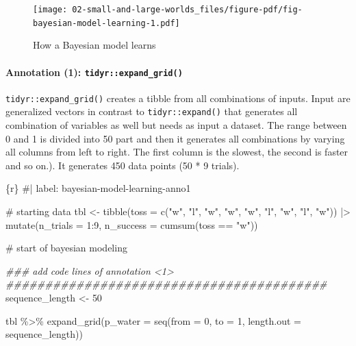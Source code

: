 \documentclass[
  letterpaper,
  DIV=11,
  numbers=noendperiod]{scrreprt}
\let\oldparagraph\paragraph
\renewcommand{\paragraph}[1]{\oldparagraph{#1}\mbox{}}
\newenvironment{Shaded}{\begin{snugshade}}{\end{snugshade}}
\newcommand{\AttributeTok}[1]{\textcolor[rgb]{0.40,0.45,0.13}{#1}}
\newcommand{\CommentTok}[1]{\textcolor[rgb]{0.37,0.37,0.37}{#1}}
\newcommand{\DecValTok}[1]{\textcolor[rgb]{0.68,0.00,0.00}{#1}}
\newcommand{\DocumentationTok}[1]{\textcolor[rgb]{0.37,0.37,0.37}{\textit{#1}}}
\newcommand{\FunctionTok}[1]{\textcolor[rgb]{0.28,0.35,0.67}{#1}}
\newcommand{\InformationTok}[1]{\textcolor[rgb]{0.37,0.37,0.37}{#1}}
\newcommand{\NormalTok}[1]{\textcolor[rgb]{0.00,0.23,0.31}{#1}}
\newcommand{\OtherTok}[1]{\textcolor[rgb]{0.00,0.23,0.31}{#1}}
\newcommand{\SpecialCharTok}[1]{\textcolor[rgb]{0.37,0.37,0.37}{#1}}
\newcommand{\StringTok}[1]{\textcolor[rgb]{0.13,0.47,0.30}{#1}}
\begin{document}
\begin{figure}[H]

{\centering \texttt{[image: 02-small-and-large-worlds\_files/figure-pdf/fig-bayesian-model-learning-1.pdf]}

}

\caption{\label{fig-bayesian-model-learning}How a Bayesian model learns}

\end{figure}

\hypertarget{sec-annotation-1-expand-grid}{%
\paragraph{\texorpdfstring{Annotation (1):
\texttt{tidyr::expand\_grid()}}{Annotation (1): tidyr::expand\_grid()}}\label{sec-annotation-1-expand-grid}}

\texttt{tidyr::expand\_grid()} creates a tibble from all combinations of
inputs. Input are generalized vectors in contrast to
\texttt{tidyr::expand()} that generates all combination of variables as
well but needs as input a dataset. The range between 0 and 1 is divided
into 50 part and then it generates all combinations by varying all
columns from left to right. The first column is the slowest, the second
is faster and so on.). It generates 450 data points (50 * 9 trials).

\begin{Shaded}
\begin{Highlighting}[]
\InformationTok{\textasciigrave{}\textasciigrave{}\textasciigrave{}\{r\}}
\CommentTok{\#| label: bayesian{-}model{-}learning{-}anno1}

\CommentTok{\# starting data}
\NormalTok{tbl }\OtherTok{\textless{}{-}} \FunctionTok{tibble}\NormalTok{(}\AttributeTok{toss =} \FunctionTok{c}\NormalTok{(}\StringTok{"w"}\NormalTok{, }\StringTok{"l"}\NormalTok{, }\StringTok{"w"}\NormalTok{, }\StringTok{"w"}\NormalTok{, }\StringTok{"w"}\NormalTok{, }\StringTok{"l"}\NormalTok{, }\StringTok{"w"}\NormalTok{, }\StringTok{"l"}\NormalTok{, }\StringTok{"w"}\NormalTok{)) }\SpecialCharTok{|\textgreater{}} 
    \FunctionTok{mutate}\NormalTok{(}\AttributeTok{n\_trials  =} \DecValTok{1}\SpecialCharTok{:}\DecValTok{9}\NormalTok{, }\AttributeTok{n\_success =} \FunctionTok{cumsum}\NormalTok{(toss }\SpecialCharTok{==} \StringTok{"w"}\NormalTok{))}

\CommentTok{\# start of bayesian modeling}

\DocumentationTok{\#\#\# add code lines of annotation \textless{}1\textgreater{} \#\#\#\#\#\#\#\#\#\#\#\#\#\#\#\#\#\#\#\#\#\#\#\#\#\#\#\#\#\#\#\#\#\#\#\#\#\#\#\#\#}
\NormalTok{sequence\_length }\OtherTok{\textless{}{-}} \DecValTok{50}

\NormalTok{tbl }\SpecialCharTok{\%\textgreater{}\%} 
  \FunctionTok{expand\_grid}\NormalTok{(}\AttributeTok{p\_water =} \FunctionTok{seq}\NormalTok{(}\AttributeTok{from =} \DecValTok{0}\NormalTok{, }\AttributeTok{to =} \DecValTok{1}\NormalTok{, }
                            \AttributeTok{length.out =}\NormalTok{ sequence\_length))}
\InformationTok{\textasciigrave{}\textasciigrave{}\textasciigrave{}}
\end{Highlighting}
\end{Shaded}
\end{document}
